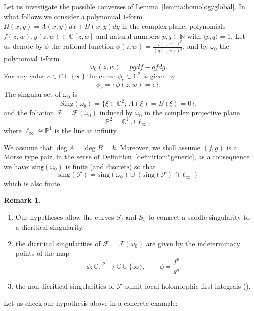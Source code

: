 \documentclass[11pt,a4paper]{amsart}
\theoremstyle{definition}
\newtheorem{remark}[theorem]{Remark}
\begin{document}
Let us investigate the possible converses of Lemma~\ref{lemma:homologyglobal}.
In what follows we consider  a polynomial $1$-form 
$
\Omega(x,y)=A(x,y)dx+B(x,y)dy
$
in the complex plane, polynomials $f(z,w), g(z,w)\in\mathbb{C}[z,w]$ and natural numbers   $p,q\in\mathbb{N}$ with $\langle p,q\rangle=1$.
Let us denote by $\phi$ the rational function
$
\phi(z,w)=\frac{(f(z,w))^p}{(g(z,w))^q}.
$
and by $\omega_0$ the polynomial $1$-form
\[
\omega_0(z,w)=p g df - q f dg.
\]
For any value $c\in\mathbb{C}\cup\{\infty\}$ the curve $\phi_c\subset \mathbb C^2$ is given by
\[
\phi_c=\{\phi(z,w)=c\}.
\]
 The singular set of $\omega_0$ is 
\[
\mathrm{Sing}(\omega_0)
=
\{\xi\in\mathbb{C}^2;\ A(\xi)=B(\xi)=0\}.
\]
and the foliation $\mathcal{F}=\mathcal{F}(\omega_0)$ induced by
$\omega_0$ in the complex projective plane
\[
\mathbb{P}^2=\mathbb{C}^2\cup \ell_\infty,
\]
where $\ell_\infty\cong\mathbb{P}^1$ is
the line at infinity.


 We assume that $\deg A=\deg B=k$. Moreover, we shall assume $(f,g)$ is a Morse type pair, in the sense of Definition~\ref{definition:*generic}, as a consequence we have: 
$\mathrm{sing}(\omega_0)$ is finite (and discrete) so that
\[
\mathrm{sing}(\mathcal{F})
=
\mathrm{sing}(\omega_0)\cup(\mathrm{sing}(\mathcal{F})\cap \ell_\infty)
\]
which is also finite.


\begin{remark}
\begin{enumerate}
\item Our hypotheses allow the curves  $S_f$ and $S_g$
to connect a saddle-singularity to a dicritical
singularity.
\item the dicritical singularities of
$\mathcal{F}=\mathcal{F}(\omega_0)$
are given by the indeterminacy points
of the map
\[
\phi:\mathbb{CP}^2 \longrightarrow \mathbb{C}\cup\{\infty\},
\qquad
\phi=\frac{f^p}{g^q}.
\]
\item the non-dicritical singularities of $\mathcal F$ admit local holomorphic 
first integrals (\cite{mattei-moussu}).
\end{enumerate}
\end{remark}
Let us check our hypothesis above in
a concrete example:
\end{document}
